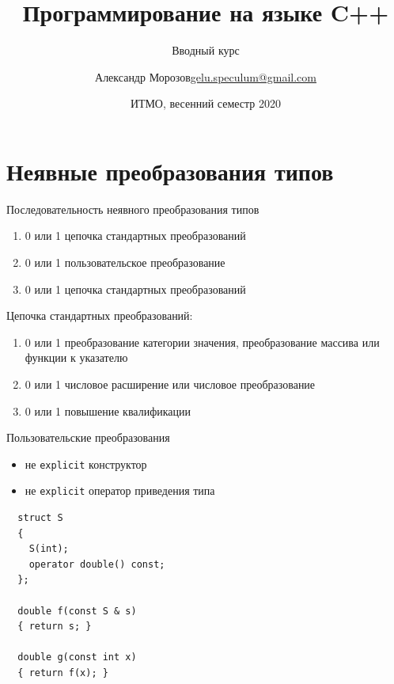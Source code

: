 \documentclass[unknownkeysallowed,xcolor=table]{beamer}
\title[C++]
{Программирование на языке C++}
\subtitle{Вводный курс}
\author[А.~Б.~Морозов]
{
  \texorpdfstring{Александр Морозов\newline\href{mailto:gelu.speculum@gmail.com}{gelu.speculum@gmail.com}}
  {Александр Морозов}
}
\date[ITMO 2020]
{ИТМО, весенний семестр 2020}
\begin{document}
\frame{\titlepage}



\section{Неявные преобразования типов}

\begin{frame}{Последовательность неявного преобразования типов}
  \begin{enumerate}
    \item 0 или 1 цепочка стандартных преобразований \vspace{0.5em}
    \item 0 или 1 пользовательское преобразование \vspace{0.5em}
    \item 0 или 1 цепочка стандартных преобразований
  \end{enumerate}

  \vspace{1em}

  Цепочка стандартных преобразований: \vspace{0.5em}
  \begin{enumerate}
    \item 0 или 1 преобразование категории значения, преобразование массива или функции к указателю \vspace{0.5em}
    \item 0 или 1 числовое расширение или числовое преобразование \vspace{0.5em}
    \item 0 или 1 повышение квалификации
  \end{enumerate}
\end{frame}

\begin{frame}[fragile]{Пользовательские преобразования}
  \begin{itemize}
    \item не \lstinline{explicit} конструктор \vspace{0.5em}
    \item не \lstinline{explicit} оператор приведения типа
  \end{itemize}
  \begin{lstlisting}
  struct S
  {
    S(int);
    operator double() const;
  };

  double f(const S & s)
  { return s; }

  double g(const int x)
  { return f(x); }
  \end{lstlisting}
\end{frame}
\end{document}

